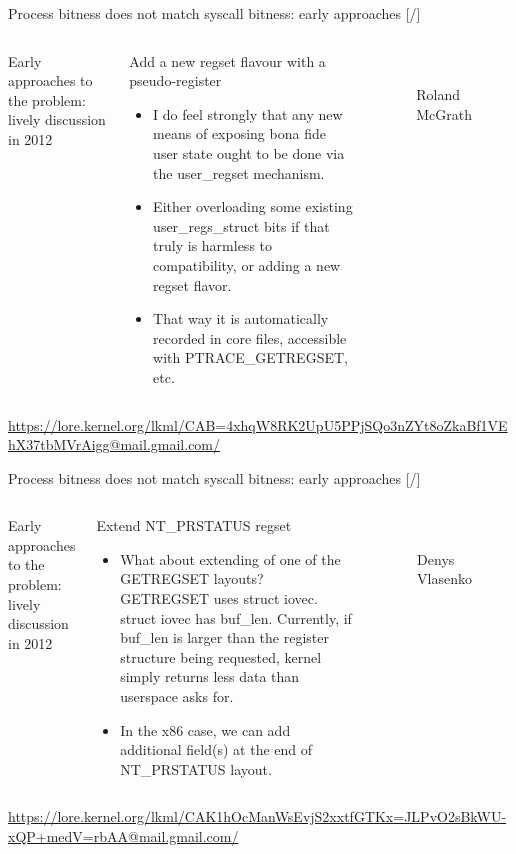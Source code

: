 \documentclass[unicode,aspectratio=169,xcolor={table,dvipsnames,usernames}]{beamer}
\begin{document}
\begin{frame}{Process bitness does not match syscall bitness: early approaches \hfill [\insertframenumber/\inserttotalframenumber]}
\Large
\begin{columns}
	\column{11cm}
		{\large Early approaches to the problem: lively discussion in 2012}
		\begin{block}{Add a new regset flavour with a pseudo-register}
		\begin{itemize}
			\item I do feel strongly that any new means of exposing bona fide user state
			ought to be done via the user\_regset mechanism.

			\item Either overloading some existing user\_regs\_struct bits
			if that truly is harmless to compatibility, or adding a new regset flavor.

			\item That way it is automatically recorded in core files,
			accessible with PTRACE\_GETREGSET, etc.
		\end{itemize}
		\end{block}
	\column{2.5cm}
		\begin{figure}
			\centering
			 \\
			Roland \\ McGrath
		\end{figure}
\end{columns}
\bigskip
\tiny
\url{https://lore.kernel.org/lkml/CAB=4xhqW8RK2UpU5PPjSQo3nZYt8oZkaBf1VEhX37tbMVrAigg@mail.gmail.com/}
\end{frame}

\begin{frame}{Process bitness does not match syscall bitness: early approaches \hfill [\insertframenumber/\inserttotalframenumber]}
\Large
\begin{columns}
	\column{11cm}
		{\large Early approaches to the problem: lively discussion in 2012}
		\begin{block}{Extend NT\_PRSTATUS regset}
		\begin{itemize}
			\item What about extending of one of the GETREGSET layouts?
			GETREGSET uses struct iovec. struct iovec has buf\_len.
			Currently, if buf\_len is larger than the register structure
			being requested, kernel simply returns less data than
			userspace asks for.

			\item In the x86 case, we can add additional field(s)
			at the end of NT\_PRSTATUS layout.
		\end{itemize}
		\end{block}
	\column{2.5cm}
		\begin{figure}
			\centering
			 \\
			Denys \\ Vlasenko
		\end{figure}
\end{columns}
\bigskip
\tiny
\url{https://lore.kernel.org/lkml/CAK1hOcManWsEvjS2xxtfGTKx=JLPvO2sBkWU-xQP+medV=rbAA@mail.gmail.com/}
\end{frame}
\end{document}
